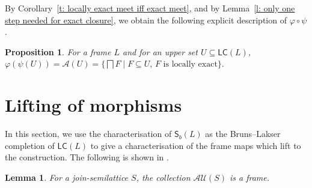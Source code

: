 \documentclass[11pt,a4paper,reqno]{amsart}
\newcommand{\tbigsqcap}{\mathop{\textstyle \bigsqcap }}%
\newcommand{\tbigcup}{\mathop{\textstyle \bigcup }}%
\newcommand{\tbigvee}{\mathop{\textstyle \bigvee }}%
\newtheorem{proposition}[theorem]{Proposition}
\newtheorem{lemma}[theorem]{Lemma}
\theoremstyle{definition}
\theoremstyle{remark}
\newcommand{\ca}[1]{\mathcal{#1}}
\newcommand{\mf}{\mathsf}
\newcommand{\se}{\subseteq}
\newcommand{\Sb}{\mf{S}_b}
\newcommand{\up}{{\uparrow}}
\begin{document}
{

By Corollary~\ref{t: locally exact meet iff exact meet}, and by Lemma~\ref{l: only one step needed for exact closure}, we obtain the following explicit description of $\varphi\circ \psi$.
\begin{proposition}\label{p: what is phipsi explicitly}
    For a frame $L$ and for an upper set $U\se \mf{LC}(L)$, $\varphi(\psi(U))=\ca{A}(U)=\{\tbigsqcap F\mid F\se  U\text{, $F$ is locally exact}\}.$
\end{proposition}


\section{Lifting of morphisms}
\label{sec.lifts}



In this section, we use the characterisation of $\Sb(L)$ as the Bruns--Lakser completion of $\mathsf{LC}(L)$ to give a characterisation of the frame maps which lift to the construction. The following is shown in \cite[Corollary~1]{BrunsLakser1970}.
\begin{lemma}
    For a join-semilattice $S$, the collection $\ca{AU}(S)$ is a frame.
\end{lemma}

}
\end{document}
